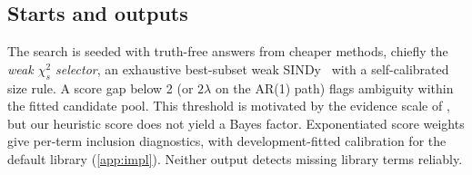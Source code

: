\subsection{Starts and outputs}
\label{sec:starts}
\label{sec:flag}
The search is seeded with truth-free answers from cheaper methods, chiefly the \emph{weak $\chi^2_s$ selector}, an exhaustive best-subset weak SINDy~\citep{messenger2021wsindy} with a self-calibrated size rule. A score gap below 2 (or $2\lambda$ on the AR(1) path) flags ambiguity within the fitted candidate pool. This threshold is motivated by the evidence scale of \citet{kass1995bayes}, but our heuristic score does not yield a Bayes factor. Exponentiated score weights give per-term inclusion diagnostics, with development-fitted calibration for the default library (\cref{app:impl}). Neither output detects missing library terms reliably.
